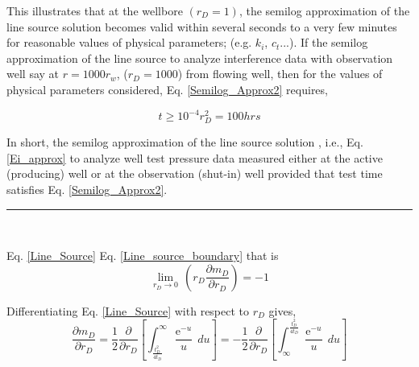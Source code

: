 \documentclass{llncs}
\numberwithin{equation}{section}
\numberwithin{figure}{section}
\numberwithin{table}{section}
\begin{document}
    This  illustrates that at the wellbore $(r_{D}=1)$, the semilog approximation of the line source solution becomes valid within several seconds to a very few minutes for reasonable values of physical parameters; (e.g. $k_{i}$, $c_{t}$...). If  the semilog approximation of the line source  to analyze  interference data with  observation well say at $r=1000r_{w}$, ($r_{D}=1000$)  from  flowing well, then for the values of physical parameters considered, Eq. \ref{Semilog_Approx2} requires,

    \begin{equation*}
        t\geq10^{-4}{r_{D}^{2}}=100 hrs
    \end{equation*}

    In short, the semilog approximation of the line source solution , i.e., Eq. \ref{Ei_approx} to analyze well test pressure data measured either at the active (producing) well or at the observation (shut-in) well provided that test time satisfies Eq. \ref{Semilog_Approx2}.\\
    \rule{\textwidth}{1pt}\\
    \vspace{15pt}

     Eq. \ref{Line_Source}  Eq. \ref{Line_source_boundary} that is
    \begin{equation*}    
    \underset{{{r}_{D}}\to 0}{\mathop{\lim }}\,\left( {{r}_{D}}\frac{\partial {{m}_{D}}}{\partial {{r}_{D}}} \right)=-1
    \end{equation*}
    
    Differentiating Eq. \ref{Line_Source} with respect to $r_{D}$ gives,
    \begin{equation}       
    \frac{\partial {{ m }_{D}}}{\partial {{r}_{D}}}=\frac{1}{2}\frac{\partial }{\partial {{r}_{D}}}\left[ \int_{\frac{t_{D}^{2}}{4{{t}_{D}}}}^{\infty }{\frac{{{\operatorname{e}}^{-u}}}{u}}\,du \right]=-\frac{1}{2}\frac{\partial }{\partial {{r}_{D}}}\left[ \int_{\infty }^{\frac{t_{D}^{2}}{4{{t}_{D}}}}{\frac{{{\operatorname{e}}^{-u}}}{u}}\,du \right]
        \label{Line_Solution_dif_rD}
    \end{equation}    
    
\end{document}
